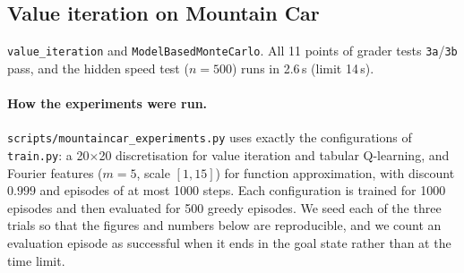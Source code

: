 \subsection{Value iteration on Mountain Car}
\texttt{value\_iteration} and \texttt{ModelBasedMonteCarlo}. All 11 points of grader tests \texttt{3a}/\texttt{3b} pass,
and the hidden speed test ($n=500$) runs in 2.6\,s (limit 14\,s).

\paragraph{How the experiments were run.} \texttt{scripts/mountaincar\_experiments.py} uses exactly the
configurations of \texttt{train.py}: a 20$\times$20 discretisation for value iteration and tabular Q-learning, and
Fourier features ($m=5$, scale $[1,15]$) for function approximation, with discount $0.999$ and episodes of at most 1000
steps. Each configuration is trained for 1000 episodes and then evaluated for 500 greedy episodes. We seed each of
the three trials so that the figures and numbers below are reproducible, and we count an evaluation episode as
successful when it ends in the goal state rather than at the time limit.

